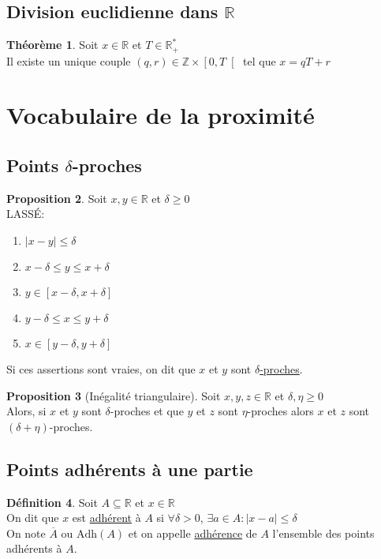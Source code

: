 \documentclass[10pt,a4paper]{article}
\theoremstyle{definition}
\newtheorem{proposition}{Proposition}[section]
\newtheorem{theorem}[proposition]{Théorème}
\newtheorem{definition}[proposition]{Définition}
\begin{document}
\subsection{Division euclidienne dans $\mathbb{R}$}
\begin{theorem}
Soit $x \in \mathbb{R}$ et $T \in \mathbb{R}_+^*$ \\
Il existe un unique couple $(q, r) \in \mathbb{Z} \times \left[0, T\right[$ tel que $x = qT + r$
\end{theorem}

\section{Vocabulaire de la proximité}
\subsection{Points $\delta$-proches}
\begin{proposition}
Soit $x, y \in \mathbb{R}$ et $\delta \geq 0$ \\
LASSÉ:
\begin{enumerate}
\item $\left| x - y \right| \leq \delta$
\item $x - \delta \leq y \leq x + \delta$
\item $y \in \left[ x - \delta, x + \delta \right]$
\item $y - \delta \leq x \leq y + \delta$
\item $x \in \left[ y - \delta, y + \delta \right]$
\end{enumerate}
Si ces assertions sont vraies, on dit que $x$ et $y$ sont \uline{$\delta$-proches}.
\end{proposition}
\begin{proposition}[Inégalité triangulaire]
Soit $x, y, z \in \mathbb{R}$ et $\delta, \eta \geq 0$ \\
Alors, si $x$ et $y$ sont $\delta$-proches et que $y$ et $z$ sont $\eta$-proches alors $x$ et $z$ sont $(\delta + \eta)$-proches.
\end{proposition}

\subsection{Points adhérents à une partie}
\begin{definition}
Soit $A \subseteq \mathbb{R}$ et $x \in \mathbb{R}$ \\
On dit que $x$ est \uline{adhérent} à $A$ si $\forall \delta > 0$, $\exists a \in A: \left| x - a \right| \leq \delta$ \\
On note $\overline{A}$ ou $\text{Adh}(A)$ et on appelle \uline{adhérence} de $A$ l'ensemble des points adhérents à $A$.
\end{definition}
\end{document}
